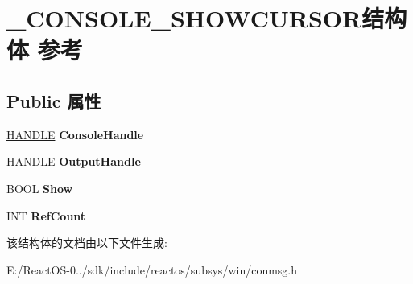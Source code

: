 \hypertarget{struct___c_o_n_s_o_l_e___s_h_o_w_c_u_r_s_o_r}{}\section{\+\_\+\+C\+O\+N\+S\+O\+L\+E\+\_\+\+S\+H\+O\+W\+C\+U\+R\+S\+O\+R结构体 参考}
\label{struct___c_o_n_s_o_l_e___s_h_o_w_c_u_r_s_o_r}
\subsection*{Public 属性}
\begin{DoxyCompactItemize}
\item 
\mbox{\label{struct___c_o_n_s_o_l_e___s_h_o_w_c_u_r_s_o_r_abef63965fb874c3891b0a16876c52a9d}} 
\hyperlink{interfacevoid}{H\+A\+N\+D\+LE} {\bfseries Console\+Handle}
\item 
\mbox{\label{struct___c_o_n_s_o_l_e___s_h_o_w_c_u_r_s_o_r_a64aadf9ab31da8559c4d5ac598be27e2}} 
\hyperlink{interfacevoid}{H\+A\+N\+D\+LE} {\bfseries Output\+Handle}
\item 
\mbox{\label{struct___c_o_n_s_o_l_e___s_h_o_w_c_u_r_s_o_r_aae7c461c7ea9687eeffb540e1e06f4ff}} 
B\+O\+OL {\bfseries Show}
\item 
\mbox{\label{struct___c_o_n_s_o_l_e___s_h_o_w_c_u_r_s_o_r_ae9732002e47c94908f13afe364e03d1c}} 
I\+NT {\bfseries Ref\+Count}
\end{DoxyCompactItemize}


该结构体的文档由以下文件生成\+:\begin{DoxyCompactItemize}
\item 
E\+:/\+React\+O\+S-\/0../sdk/include/reactos/subsys/win/conmsg.\+h\end{DoxyCompactItemize}
